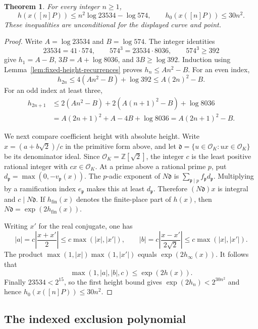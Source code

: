 \documentclass[11pt,a4paper]{article}
\newtheorem{theorem}{Theorem}[section]
\theoremstyle{definition}
\theoremstyle{remark}
\begin{document}
\begin{theorem}\label{thm:fixed-height-quadratic}
For every integer $n\ge1$,
\[
 h(x([n]P))\le n^2\log23534-\log574,
 \qquad h_0(x([n]P))\le30n^2.
\]
These inequalities are unconditional for the displayed curve and point.
\end{theorem}
\begin{proof}
Write $A=\log23534$ and $B=\log574$. The integer identities
\[
 23534=41\cdot574,\qquad
 574^3=23534\cdot8036,\qquad574^3\ge392
\]
give $h_1=A-B$, $3B=A+\log8036$, and $3B\ge\log392$.
Induction using Lemma~\ref{lem:fixed-height-recurrences} proves
$h_n\le An^2-B$. For an even index,
\[
 h_{2n}\le4(An^2-B)+\log392\le A(2n)^2-B.
\]
For an odd index at least three,
\[
 \begin{split}
 h_{2n+1}&\le2(An^2-B)+2(A(n+1)^2-B)+\log8036\\
 &=A(2n+1)^2+A-4B+\log8036
  =A(2n+1)^2-B.
 \end{split}
\]

We next compare coefficient height with absolute height. Write
$x=(a+b\sqrt2)/c$ in the primitive form above, and let
$\mathfrak d=\{u\in\mathcal O_K:ux\in\mathcal O_K\}$ be its
denominator ideal. Since $\mathcal O_K=\mathbb Z[\sqrt2]$, the
integer $c$ is the least positive rational integer with
$cx\in\mathcal O_K$. At a prime above a rational prime $p$, put
$d_{\mathfrak p}=\max(0,-v_{\mathfrak p}(x))$.
The $p$-adic exponent of $N\mathfrak d$ is
$\sum_{\mathfrak p\mid p}f_{\mathfrak p}d_{\mathfrak p}$.
Multiplying by a ramification index $e_{\mathfrak p}$ makes this
at least $d_{\mathfrak p}$. Therefore
$(N\mathfrak d)x$ is integral and $c\mid N\mathfrak d$.
If $h_{\mathrm{fin}}(x)$ denotes the finite-place part of $h(x)$,
then $N\mathfrak d=\exp(2h_{\mathrm{fin}}(x))$.

Writing $x'$ for the real conjugate, one has
\[
 |a|=c\left|\frac{x+x'}2\right|\le c\max(|x|,|x'|),\qquad
 |b|=c\left|\frac{x-x'}{2\sqrt2}\right|
                         \le c\max(|x|,|x'|).
\]
The product $\max(1,|x|)\max(1,|x'|)$ equals
$\exp(2h_{\infty}(x))$. It follows that
\[
                  \max(1,|a|,|b|,c)\le\exp(2h(x)).
\]
Finally $23534<2^{15}$, so the first height bound gives
$\exp(2h_n)<2^{30n^2}$ and hence $h_0(x([n]P))\le30n^2$.
\end{proof}

\subsection{The indexed exclusion polynomial}
\end{document}

